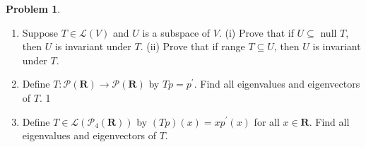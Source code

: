 \documentclass[12pt]{article}
\theoremstyle{definition}
\newtheorem{problem}{Problem}
\begin{document}
\begin{problem}~
    \begin{enumerate}
        \item Suppose $T \in \mathcal{L}(V)$ and $U$ is a subspace of $V$.
        (i) Prove that if $U \subseteq$ null $T$, then $U$ is invariant under $T$.
        (ii) Prove that if range $T \subseteq U$, then $U$ is invariant under $T$.
    \item Define $T: \mathcal{P}(\mathbf{R}) \rightarrow \mathcal{P}(\mathbf{R})$ by $T p=p^{\prime}$. Find all eigenvalues and eigenvectors of $T$.
    1\item Define $T \in \mathcal{L}\left(\mathcal{P}_4(\mathbf{R})\right)$ by $(T p)(x)=x p^{\prime}(x)$ for all $x \in \mathbf{R}$. Find all eigenvalues and eigenvectors of $T$.
    \end{enumerate}
\end{problem}
\end{document}
